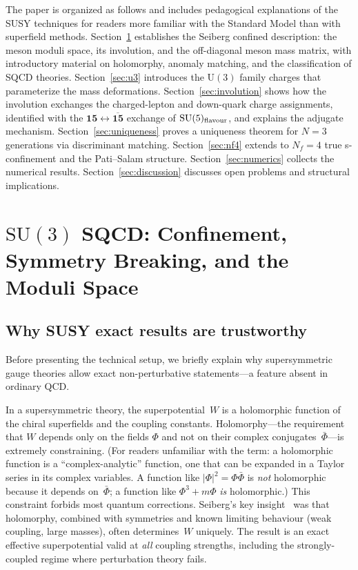 \documentclass[12pt,a4paper]{article}
\newcommand{\SU}{\mathrm{SU}}
\newcommand{\UU}{\mathrm{U}}
\newcommand{\Nf}{N_f}
\begin{document}
The paper is organized as follows and includes pedagogical
explanations of the SUSY techniques for readers more familiar with
the Standard Model than with superfield methods.
Section~\ref{sec:seiberg}
establishes the Seiberg confined description: the meson moduli space,
its involution, and the off-diagonal meson mass matrix, with
introductory material on holomorphy, anomaly matching, and the
classification of SQCD theories.
Section~\ref{sec:u3} introduces the $\UU(3)$ family charges that
parameterize the mass deformations. Section~\ref{sec:involution}
shows how the involution exchanges the charged-lepton and down-quark
charge assignments, identified with the $\mathbf{15} \leftrightarrow
\overline{\mathbf{15}}$ exchange of $\SU(5)_{\rm flavour}$, and
explains the adjugate mechanism.
Section~\ref{sec:uniqueness} proves a uniqueness theorem for $N=3$
generations via discriminant matching.
Section~\ref{sec:nf4} extends to $\Nf=4$ true s-confinement and the
Pati--Salam structure. Section~\ref{sec:numerics} collects
the numerical results. Section~\ref{sec:discussion} discusses
open problems and structural implications.


\section{$\SU(3)$ SQCD: Confinement, Symmetry Breaking, and the Moduli
  Space}
\label{sec:seiberg}

\subsection{Why SUSY exact results are trustworthy}

Before presenting the technical setup, we briefly explain why
supersymmetric gauge theories allow exact non-perturbative
statements---a feature absent in ordinary QCD.

In a supersymmetric theory, the superpotential~$W$ is a holomorphic
function of the chiral superfields and the coupling constants.
Holomorphy---the requirement that $W$ depends only on the fields
$\Phi$ and not on their complex conjugates~$\bar\Phi$---is extremely
constraining. (For readers unfamiliar with the term: a holomorphic
function is a ``complex-analytic'' function, one that can be
expanded in a Taylor series in its complex variables. A function
like $|\Phi|^2 = \Phi\bar\Phi$ is \emph{not} holomorphic because it
depends on~$\bar\Phi$; a function like $\Phi^3 + m\Phi$ \emph{is}
holomorphic.) This constraint forbids most quantum corrections.
Seiberg's key insight~\cite{Seiberg:1994bz} was that holomorphy,
combined with symmetries and known limiting behaviour (weak coupling,
large masses), often determines~$W$ uniquely.
The result is an exact effective superpotential valid at
\emph{all} coupling strengths, including the strongly-coupled
regime where perturbation theory fails.
\end{document}
